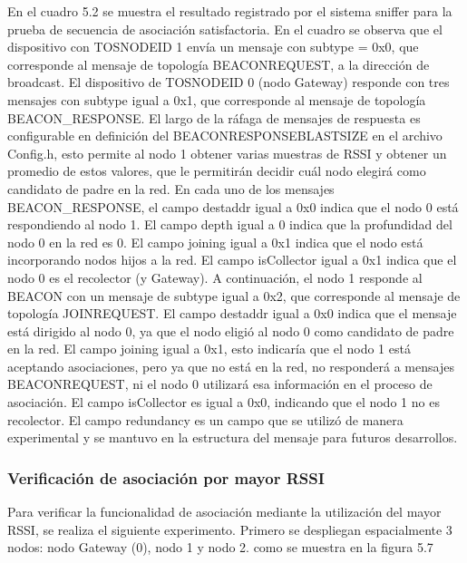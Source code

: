 En el cuadro 5.2 se muestra el resultado registrado por el sistema sniffer para la prueba de secuencia de asociación satisfactoria. En el cuadro se observa que el dispositivo con TOS\textunderscore NODE\textunderscore ID 1 envía un mensaje con subtype = 0x0, que corresponde al mensaje de topología BEACON\textunderscore REQUEST\textunderscore , a la dirección de broadcast. El dispositivo de TOS\textunderscore NODE\textunderscore ID 0 (nodo Gateway) responde con tres mensajes con subtype igual a 0x1, que corresponde al mensaje de topología BEACON\_RESPONSE. El largo de la ráfaga de mensajes de respuesta es configurable en definición del  BEACON\textunderscore RESPONSE\textunderscore BLAST\textunderscore SIZE en el archivo Config.h, esto permite al nodo 1 obtener varias muestras de RSSI y obtener un promedio de estos valores, que le permitirán decidir cuál nodo elegirá como candidato de padre en la red. En cada uno de los mensajes BEACON\_RESPONSE, el campo destaddr igual a 0x0 indica que el nodo 0 está respondiendo al nodo 1. El campo depth igual a 0 indica que la profundidad del nodo 0 en la red es 0. El campo joining igual a 0x1 indica que el nodo está incorporando nodos hijos a la red. El campo isCollector igual a 0x1 indica que el nodo 0 es el recolector (y Gateway). A continuación, el nodo 1 responde al BEACON con un mensaje de subtype igual a 0x2, que corresponde al mensaje de topología JOIN\textunderscore REQUEST. El campo destaddr igual a 0x0 indica que el mensaje está dirigido al nodo 0, ya que el nodo eligió al nodo 0 como candidato de padre en la red. El campo  joining igual a 0x1, esto indicaría que el nodo 1 está aceptando asociaciones, pero ya que no está en la red, no responderá a mensajes BEACON\textunderscore REQUEST\textunderscore , ni el nodo 0 utilizará esa información en el proceso de asociación. El campo isCollector es igual a 0x0, indicando que el nodo 1 no es recolector. El campo redundancy es un campo que se utilizó de manera experimental y se mantuvo en la estructura del mensaje para futuros desarrollos.\\

\subsubsection{Verificación de asociación por mayor RSSI}
Para verificar la funcionalidad de asociación mediante la utilización del mayor RSSI, se realiza el siguiente experimento. Primero se despliegan espacialmente 3 nodos: nodo Gateway (0), nodo 1 y nodo 2. como se muestra en la figura 5.7

